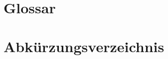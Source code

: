 \documentclass[12pt]{article} %
\title{\myTitle}
\author{\myAuthor}
\begin{document}
	\setcounter{secnumdepth}{0}
	\maketitle %
	\thispagestyle{empty}
	\newpage
	
	\tableofcontents
	\clearpage
	
	\listoffigures
	\newpage
	\clearpage
	
	\listoftables
	\newpage
	
	
	\section{Glossar}
	\label{sec:Glossar}
	\glossar
	\glossarycommand
	\newpage
	
	\section{Abkürzungsverzeichnis}
	\label{sec:abkuerzungsverzeichnis}
	\abkuerzungsverzeichnis
	\newpage
	
	\setcounter{secnumdepth}{1}
	\einleitung
	
	\projektplanung
	
	\analysephase
	
	\entwurfsphase
	
	\implementierungsphase
	
	\abnahmephase
	
	\dokumentation
	
	\fazit
	\pagebreak
	
	\quellenverzeichnis
		
	\anhang
	
\printglossaries
\end{document}
